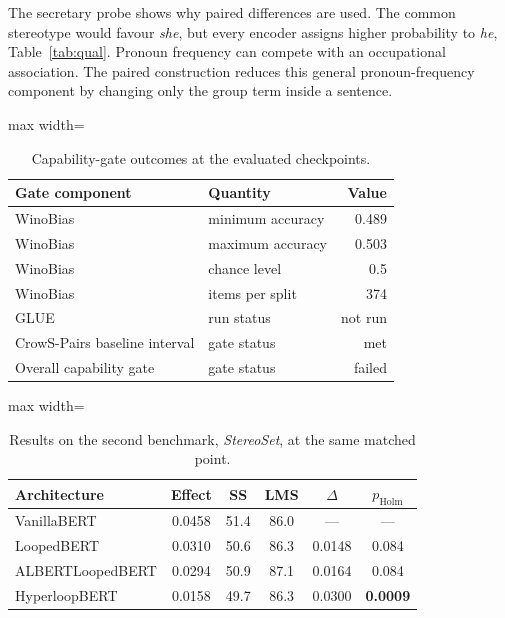 \documentclass[sigconf,natbib=true,anonymous=true]{acmart}
\begin{document}
The secretary probe shows why paired differences are used. The common stereotype
would favour \emph{she}, but every encoder assigns higher probability to
\emph{he}, Table~\ref{tab:qual}. Pronoun frequency can compete with an
occupational association. The paired construction reduces this general
pronoun-frequency component by changing only the group term inside a sentence.

\begin{table}[!htp]
\centering
\caption{Capability-gate outcomes at the evaluated checkpoints.}
\label{tab:gate}
\footnotesize
\begin{adjustbox}{max width=\columnwidth}
\begin{tabular}{llr}
\toprule
Gate component & Quantity & Value \\
\midrule
WinoBias & minimum accuracy & 0.489 \\
WinoBias & maximum accuracy & 0.503 \\
WinoBias & chance level & 0.5 \\
WinoBias & items per split & 374 \\
GLUE & run status & not run \\
CrowS-Pairs baseline interval & gate status & met \\
Overall capability gate & gate status & failed \\
\bottomrule
\end{tabular}
\end{adjustbox}
\end{table}

\begin{table}[!htp]
\centering
\caption{Results on the second benchmark, \emph{StereoSet}, at the same matched point.}
\label{tab:stereoset}
\footnotesize
\begin{adjustbox}{max width=\columnwidth}
\begin{tabular}{lccccc}
\toprule
Architecture & Effect & SS & LMS & $\Delta$ & $p_{\text{Holm}}$ \\
\midrule
VanillaBERT \citep{devlin2019bert}     & 0.0458 & 51.4 & 86.0 & --- & --- \\
LoopedBERT   \citep{saunshi2025looped}    & 0.0310 & 50.6 & 86.3 & 0.0148 & 0.084 \\
ALBERTLoopedBERT \citep{lan2020albert} & 0.0294 & 50.9 & 87.1 & 0.0164 & 0.084 \\
HyperloopBERT \citep{zeitoun2026hyperloop}   & 0.0158 & 49.7 & 86.3 & 0.0300 & \textbf{0.0009} \\
\bottomrule
\end{tabular}
\end{adjustbox}
\end{table}
\end{document}
